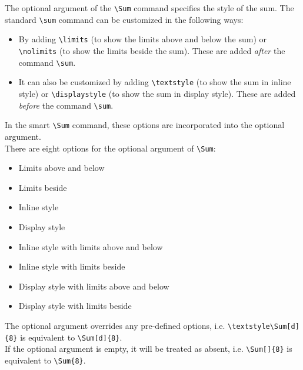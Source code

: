 The optional argument of the \verb!\Sum! command specifies the style of the sum. The standard \verb!\sum! command can be customized in the following ways:
\begin{itemize}
    \item By adding \verb!\limits! (to show the limits above and below the sum) or \verb!\nolimits! (to show the limits beside the sum). These are added \emph{after} the command \verb!\sum!.
    \item It can also be customized by adding \verb!\textstyle! (to show the sum in inline style) or \verb!\displaystyle! (to show the sum in display style). These are added \emph{before} the command \verb!\sum!.
\end{itemize}
In the smart \verb!\Sum! command, these options are incorporated into the optional argument.\\

There are eight options for the optional argument of \verb!\Sum!:
\vspace*{-10pt}
\begin{multicols}{2}
\begin{itemize}[leftmargin=0.5in,labelsep=0.3in]
    \item[\texttt{l}] Limits above and below
    \item[\texttt{n}] Limits beside
    \item[\texttt{i}] Inline style
    \item[\texttt{d}] Display style
    \item[\texttt{il}] Inline style with limits above and below
    \item[\texttt{in}] Inline style with limits beside
    \item[\texttt{dl}] Display style with limits above and below
    \item[\texttt{dn}] Display style with limits beside
\end{itemize}
\end{multicols}

The optional argument overrides any pre-defined options, i.e. \verb!\textstyle\Sum[d]{8}! is equivalent to \verb!\Sum[d]{8}!.\\

If the optional argument is empty, it will be treated as absent, i.e. \verb!\Sum[]{8}! is equivalent to \verb!\Sum{8}!.


